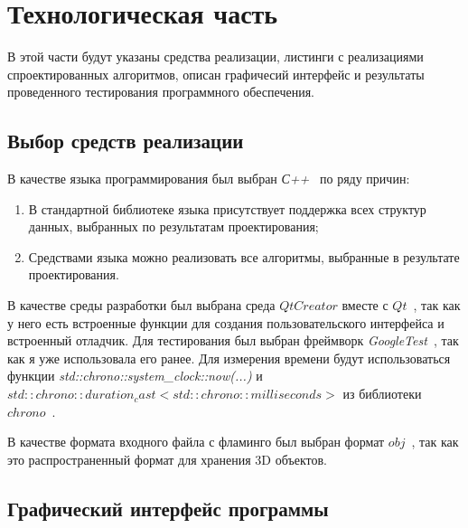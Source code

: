 \chapter{Технологическая часть}

В этой части будут указаны средства реализации, листинги с реализациями спроектированных алгоритмов, описан графичесий интерфейс и результаты проведенного тестирования программного обеспечения.

\section{Выбор средств реализации}

В качестве языка программирования был выбран \textit{С++}~\cite{cpp} по ряду причин:
\begin{enumerate}[label=\arabic*)]
	\item В стандартной библиотеке языка присутствует поддержка всех структур данных, выбранных по результатам проектирования;
	\item Средствами языка можно реализовать все алгоритмы, выбранные в результате проектирования.
\end{enumerate}

В качестве среды разработки был выбрана среда $Qt Creator$ вместе с $Qt$~\cite{qt}, так как у него есть встроенные функции для создания пользовательского интерфейса и встроенный отладчик.
Для тестирования был выбран фреймворк \textit{GoogleTest}~\cite{gtest}, так как я уже использовала его ранее.
Для измерения времени будут использоваться функции  \textit{std::chrono::system\_clock::now(...)} и \textit{$std::chrono::duration_cast<std::chrono::milliseconds>$} из библиотеки $chrono$~\cite{cpp-lang-chrono}.

В качестве формата входного файла с фламинго был выбран формат $obj$~\cite{obj}, так как это распространенный формат для хранения 3D объектов.


\section{Графический интерфейс программы}


